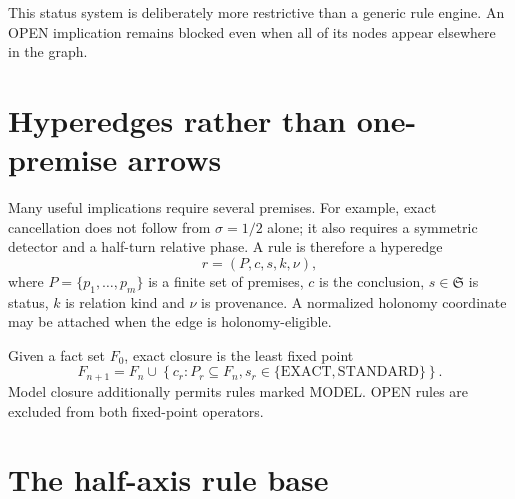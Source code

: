 This status system is deliberately more restrictive than a generic rule engine.
An OPEN implication remains blocked even when all of its nodes appear elsewhere
in the graph.

\section{Hyperedges rather than one-premise arrows}

Many useful implications require several premises.  For example, exact
cancellation does not follow from $\sigma=1/2$ alone; it also requires a
symmetric detector and a half-turn relative phase.  A rule is therefore a
hyperedge
\begin{equation}
 r=(P,c,s,k,\nu),
 \label{eq:solver-rule}
\end{equation}
where $P=\{p_1,\ldots,p_m\}$ is a finite set of premises, $c$ is the
conclusion, $s\in\mathfrak S$ is status, $k$ is relation kind and $\nu$ is
provenance.  A normalized holonomy coordinate may be attached when the edge is
holonomy-eligible.

Given a fact set $F_0$, exact closure is the least fixed point
\begin{equation}
 F_{n+1}=F_n\cup
 \left\{c_r:
 P_r\subseteq F_n,
 s_r\in\{\mathrm{EXACT},\mathrm{STANDARD}\}
 \right\}.
 \label{eq:exact-closure}
\end{equation}
Model closure additionally permits rules marked MODEL.  OPEN rules are excluded
from both fixed-point operators.

\section{The half-axis rule base}

